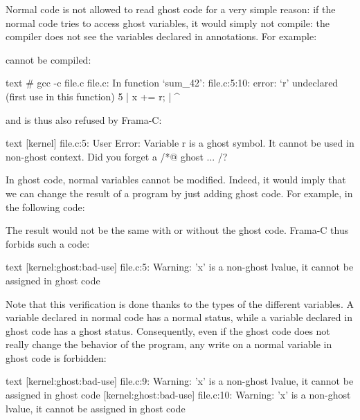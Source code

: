 Normal code is not allowed to read ghost code for a very simple reason:
if the normal code tries to access ghost variables,
it would simply not compile: the compiler does not see the variables
declared in annotations. For example:




cannot be compiled:


\begin{CodeBlock}{text}
# gcc -c file.c
file.c: In function ‘sum_42’:
file.c:5:10: error: ‘r’ undeclared (first use in this function)
    5 |     x += r;
      |          ^
\end{CodeBlock}


and is thus also refused by Frama-C:


\begin{CodeBlock}{text}
[kernel] file.c:5: User Error:
  Variable r is a ghost symbol. It cannot be used in non-ghost context. Did you forget a /*@ ghost ... /?
\end{CodeBlock}


In ghost code, normal variables cannot be modified. Indeed, it
would imply that we can change the result of a program by just
adding ghost code. For example, in the following code:




The result would not be the same with or without the ghost code.
Frama-C thus forbids such a code:


\begin{CodeBlock}{text}
[kernel:ghost:bad-use] file.c:5: Warning:
  'x' is a non-ghost lvalue, it cannot be assigned in ghost code
\end{CodeBlock}


Note that this verification is done thanks to the types of the different
variables. A variable declared in normal code has a normal status, while
a variable declared in ghost code has a ghost status. Consequently, even
if the ghost code does not really change the behavior of the program, any
write on a normal variable in ghost code is forbidden:




\begin{CodeBlock}{text}
[kernel:ghost:bad-use] file.c:9: Warning:
  'x' is a non-ghost lvalue, it cannot be assigned in ghost code
[kernel:ghost:bad-use] file.c:10: Warning:
  'x' is a non-ghost lvalue, it cannot be assigned in ghost code
\end{CodeBlock}


